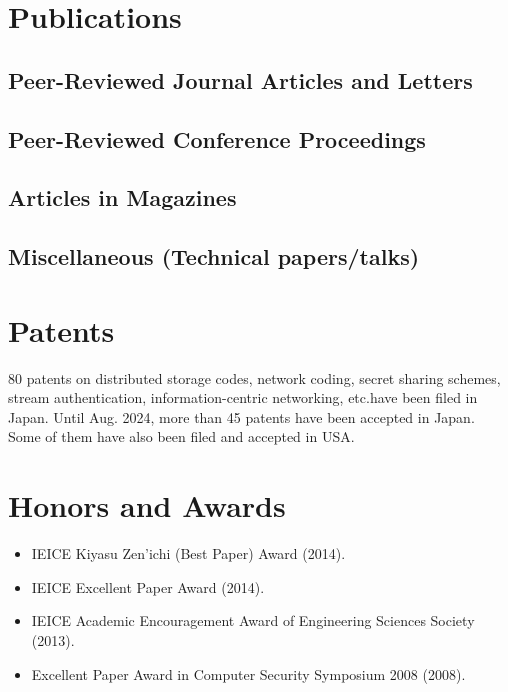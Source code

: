 \section*{Publications}

\subsection*{Peer-Reviewed Journal Articles and Letters}


\subsection*{Peer-Reviewed Conference Proceedings}


\subsection*{Articles in Magazines}


\subsection*{Miscellaneous (Technical papers/talks)}



\section*{Patents}
80 patents on distributed storage codes, network coding, secret sharing schemes, stream authentication, information-centric networking, etc.\@ have been filed in Japan. Until Aug. 2024, more than 45 patents have been accepted in Japan. Some of them have also been filed and accepted in USA.

\section*{Honors and Awards}
\begin{itemize}
  \item IEICE Kiyasu Zen'ichi (Best Paper) Award (2014).
  \item IEICE Excellent Paper Award (2014).
  \item IEICE Academic Encouragement Award of Engineering Sciences Society (2013).
  \item Excellent Paper Award in Computer Security Symposium 2008 (2008).
\end{itemize}

